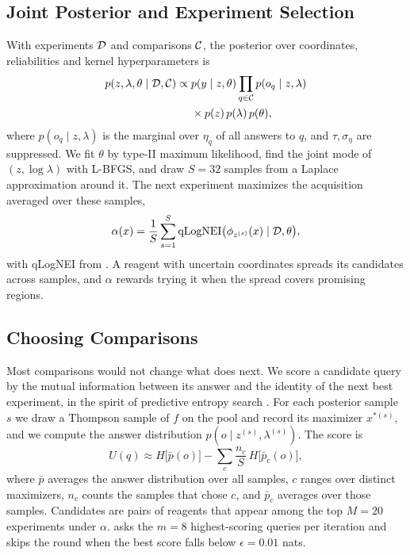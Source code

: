 \subsection{Joint Posterior and Experiment Selection}
\label{sec:posterior}
With experiments $\mathcal{D}$ and comparisons $\mathcal{C}$, the posterior over coordinates, reliabilities and kernel hyperparameters is
\begin{equation}
\begin{aligned}
p(z,\lambda,\theta\mid\mathcal{D},\mathcal{C})\propto{}&p(y\mid z,\theta)\prod_{q\in\mathcal{C}}p(o_q\mid z,\lambda)\\
&\times p(z)\,p(\lambda)\,p(\theta),
\end{aligned}
\label{eq:posterior}
\end{equation}
where $p(o_q\mid z,\lambda)$ is the marginal over $\eta_q$ of all answers to $q$, and $\tau,\sigma_\eta$ are suppressed. We fit $\theta$ by type-II maximum likelihood, find the joint mode of $(z,\log\lambda)$ with L-BFGS, and draw $S=32$ samples from a Laplace approximation around it. The next experiment maximizes the acquisition averaged over these samples,
\begin{equation}
\alpha(x)=\frac{1}{S}\sum_{s=1}^{S}\mathrm{qLogNEI}\big(\phi_{z^{(s)}}(x)\mid\mathcal{D},\theta\big),
\label{eq:acq}
\end{equation}
with qLogNEI from \citet{ament2023unexpected}. A reagent with uncertain coordinates spreads its candidates across samples, and $\alpha$ rewards trying it when the spread covers promising regions.

\subsection{Choosing Comparisons}
\label{sec:queries}
Most comparisons would not change what \ours{} does next. We score a candidate query by the mutual information between its answer and the identity of the next best experiment, in the spirit of predictive entropy search \citep{hernandezlobato2014pes}. For each posterior sample $s$ we draw a Thompson sample of $f$ on the pool and record its maximizer $x^{\ast(s)}$, and we compute the answer distribution $p(o\mid z^{(s)},\lambda^{(s)})$. The score is
\begin{equation}
U(q)\approx H\Big[\bar p(o)\Big]-\sum_{c}\frac{n_c}{S}\,H\Big[\bar p_c(o)\Big],
\label{eq:info}
\end{equation}
where $\bar p$ averages the answer distribution over all samples, $c$ ranges over distinct maximizers, $n_c$ counts the samples that chose $c$, and $\bar p_c$ averages over those samples. Candidates are pairs of reagents that appear among the top $M=20$ experiments under $\alpha$. \ours{} asks the $m=8$ highest-scoring queries per iteration and skips the round when the best score falls below $\epsilon=0.01$ nats.

